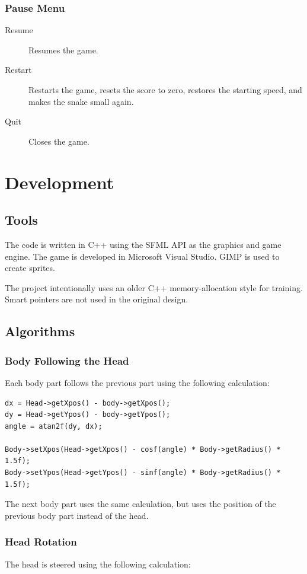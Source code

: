 \subsubsection{Pause Menu}
\begin{description}
	\item[Resume] Resumes the game.
	\item[Restart] Restarts the game, resets the score to zero, restores the starting speed, and makes the snake small again.
	\item[Quit] Closes the game.
\end{description}

\section{Development}

\subsection{Tools}
The code is written in C++ using the SFML API as the graphics and game engine. The game is developed in Microsoft Visual Studio. GIMP is used to create sprites.

The project intentionally uses an older C++ memory-allocation style for training. Smart pointers are not used in the original design.

\subsection{Algorithms}

\subsubsection{Body Following the Head}
Each body part follows the previous part using the following calculation:

\begin{verbatim}
dx = Head->getXpos() - body->getXpos();
dy = Head->getYpos() - body->getYpos();
angle = atan2f(dy, dx);

Body->setXpos(Head->getXpos() - cosf(angle) * Body->getRadius() * 1.5f);
Body->setYpos(Head->getYpos() - sinf(angle) * Body->getRadius() * 1.5f);
\end{verbatim}

The next body part uses the same calculation, but uses the position of the previous body part instead of the head.

\subsubsection{Head Rotation}
The head is steered using the following calculation:

